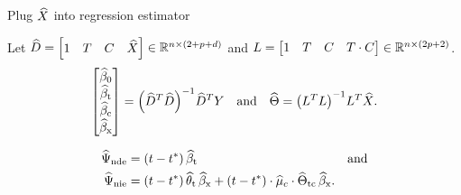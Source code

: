 \documentclass[aspectratio=169]{beamer}
\theoremstyle{remark}
\begin{document}






\begin{frame}{Plug $\widehat{X}$ into regression estimator}

    Let $\widehat{D} = \begin{bmatrix} 1 & T & C  & \widehat{X} \end{bmatrix} \in \mathbb{R}^{n \times (2 + p + d)}$ and $L = \begin{bmatrix} 1 & T & C  & T \cdot C \end{bmatrix} \in \mathbb{R}^{n \times (2 p + 2)}$.
    \begin{equation*}
        \begin{bmatrix}
            \betazerohat \\
            \betathat    \\
            \betachat    \\
            \betaxhat
        \end{bmatrix}
        = \paren*{\Dhat^T \Dhat}^{-1} \Dhat^T Y
        \quad \text{and} \quad
        \Thetahat
        = \paren*{\Wfull^T \Wfull}^{-1} \Wfull^T \Xhat.
    \end{equation*}

    \begin{align*}
        \ndehat & = \paren*{t - t^*} \, \betathat                                                                                        & \text{and} \\
        \niehat & = \paren*{t - t^*} \, \thetathat \, \betaxhat + \paren*{t - t^*} \cdot \widehat{\mu}_c \cdot \Thetatchat \, \betaxhat.
    \end{align*}
\end{frame}
\end{document}

